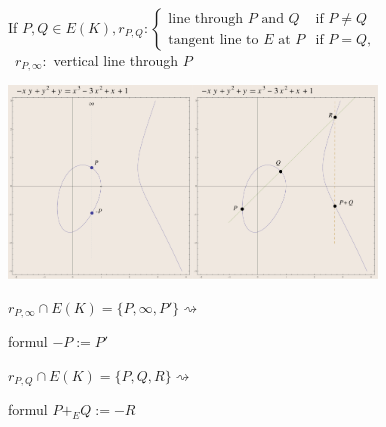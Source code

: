 \documentclass[10pt,final]{beamer} %
\theoremstyle{definition}
\begin{document}
\begin{frame}

If $P,Q\in E(K), r_{P,Q}:\begin{cases}
                     \text{line through $P$ and }Q &\text{if }P\neq Q\\
                     \text{tangent line to $E$ at }P &\text{if }P=Q,
                    \end{cases}$\\ \ \hfill $r_{P,\infty}:$ vertical line through $P$
\pause
\begin{center}
\includegraphics[width=4.9cm]{images/ad15.pdf}\includegraphics[width=4.9cm]{images/add7.pdf}\pause
\end{center}

{$r_{P,\infty}\cap E(K)=\{P,\infty,P'\}$}\hfill$\rightsquigarrow$
{\begin{beamercolorbox}[shadow=true,center,rounded=true,wd=2cm]{formul}
             $-P:=P'$
            \end{beamercolorbox}}\medskip

{$r_{P,Q}\cap E(K)=\{P,Q,R\}$}\hfill$\rightsquigarrow$
{\begin{beamercolorbox}[shadow=true,center,rounded=true,wd=2.9cm]{formul}
$P+_E Q:=-R$
            \end{beamercolorbox}}
\end{frame}
\end{document}
